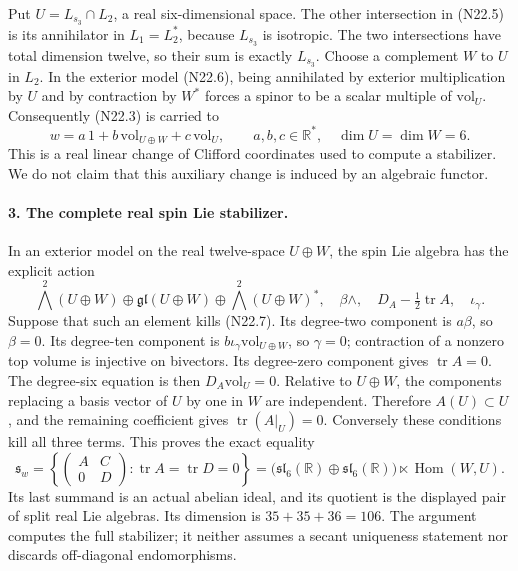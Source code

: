 Put $U=L_{s_3}\cap L_2$, a real six-dimensional space.
The other intersection in (N22.5) is its annihilator in
$L_1=L_2^*$, because $L_{s_3}$ is isotropic. The two
intersections have total dimension twelve, so their sum is
exactly $L_{s_3}$. Choose a complement $W$ to $U$ in $L_2$.
In the exterior model (N22.6), being annihilated by exterior
multiplication by $U$ and by contraction by $W^*$ forces a
spinor to be a scalar multiple of $\mathrm{vol}_U$.
Consequently (N22.3) is carried to
\begin{equation}
 w=a\,1+b\,\mathrm{vol}_{U\oplus W}
                    +c\,\mathrm{vol}_U,
       \qquad a,b,c\in\mathbb R^*,\quad
       \dim U=\dim W=6.                              \tag{N22.7}
\end{equation}
This is a real linear change of Clifford coordinates used to
compute a stabilizer. We do not claim that this auxiliary change
is induced by an algebraic functor.

\paragraph{3. The complete real spin Lie stabilizer.}
In an exterior model on the real twelve-space $U\oplus W$,
the spin Lie algebra has the explicit action
\[
 \bigwedge^2(U\oplus W)\oplus\mathfrak{gl}(U\oplus W)
          \oplus\bigwedge^2(U\oplus W)^*,
 \quad
 \beta\wedge,\quad D_A-\tfrac12\operatorname{tr}A,
                       \quad\iota_\gamma.
\]
Suppose that such an element kills (N22.7).
Its degree-two component is $a\beta$, so $\beta=0$.
Its degree-ten component is
$b\iota_\gamma\mathrm{vol}_{U\oplus W}$, so $\gamma=0$;
contraction of a nonzero top volume is injective on bivectors.
Its degree-zero component gives $\operatorname{tr}A=0$.
The degree-six equation is then
$D_A\mathrm{vol}_U=0$. Relative to $U\oplus W$, the
components replacing a basis vector of $U$ by one in $W$
are independent. Therefore $A(U)\subset U$, and the
remaining coefficient gives $\operatorname{tr}(A|_U)=0$.
Conversely these conditions kill all three terms.
This proves the exact equality
\begin{equation}
 \mathfrak s_w=
  \left\{\begin{pmatrix}A&C\\0&D\end{pmatrix}:
          \operatorname{tr}A=\operatorname{tr}D=0\right\}
 =\bigl(\mathfrak{sl}_6(\mathbb R)\oplus
              \mathfrak{sl}_6(\mathbb R)\bigr)
                  \ltimes\operatorname{Hom}(W,U).   \tag{N22.8}
\end{equation}
Its last summand is an actual abelian ideal, and its quotient
is the displayed pair of split real Lie algebras. Its dimension
is $35+35+36=106$. The argument computes the full stabilizer;
it neither assumes a secant uniqueness statement nor discards
off-diagonal endomorphisms.

